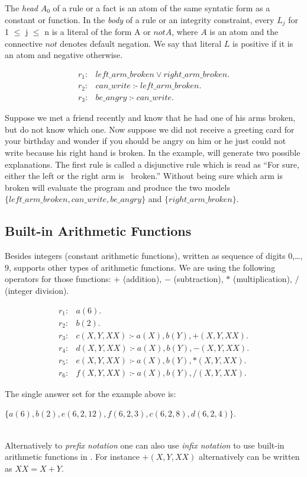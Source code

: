 \documentclass[14pt,a4paper, titlepage]{article}
\DeclareMathOperator{\leftimpl}{:-}
\begin{document}
The \emph{head} $A_0$ of a rule or a fact is an atom of the 
same syntatic form as a constant or function. In the 
\emph{body} of a rule or an integrity constraint, every 
$L_j$ for 1 $\leq$ j $\leq$ n is a literal of the form A or 
$\mathit{not}A$, where $A$ is an atom and the connective 
$\mathit{not}$ denotes default negation. We say that 
literal $L$ is positive if it is an atom and negative 
otherwise. 
\begin{exmp}
\begin{align*}
r_1\colon& \mathit{left\_arm\_broken} \vee 
\mathit{right\_arm\_broken}.\\
r_2\colon& \mathit{can\_write} \leftimpl 
\mathit{left\_arm\_broken}.\\
r_3\colon& \mathit{be\_angry} \leftimpl 
\mathit{can\_write}.
\end{align*}
\end{exmp}
Suppose we met a friend recently and know that he had one 
of his arms broken, but do not know which one. Now suppose 
we did not receive a greeting card for your birthday and 
wonder if you should be angry on him or he just could not 
write because his right hand is broken. In the example, 
\dlvhex{} will generate two possible explanations. The 
first rule is called a disjunctive rule which is read as 
\enquote{For sure, either the left or the right arm is \
broken.} Without being sure which arm is broken \dlvhex{} 
will evaluate the program and produce the two models 
$\mathit{\{left\_arm\_broken, can\_write, be\_angry\}}$ and 
$\mathit{\{right\_arm\_broken\}}$.  

\subsection{Built-in Arithmetic Functions}
Besides integers (constant arithmetic functions), written 
as sequence of digits $0$,\dots,$9$, \dlvhex{} supports 
other types of arithmetic functions. We are using the 
following operators for those functions: $+$ (addition), 
$-$ (subtraction), $*$ (multiplication), $/$ (integer 
division). 
\begin{exmp}
\begin{align*}
r_1\colon& \mathit{a}(6). \\
r_2\colon& \mathit{b}(2). \\
r_3\colon& c(X,Y,XX) \leftimpl a(X), b(Y),+(X, Y, XX). \\
r_4\colon& d(X,Y,XX) \leftimpl a(X), b(Y),-(X, Y, XX). \\
r_5\colon& e(X,Y,XX) \leftimpl a(X), b(Y),*(X, Y, XX). \\
r_6\colon& f(X,Y,XX) \leftimpl a(X), b(Y),/(X, Y, XX).
\end{align*}
\end{exmp}
The single answer set for the example above is:\\ 
\centerline{$\mathit{\{a(6),b(2),e(6,2,12),f(6,2,3),c(6,2,8),d(6,2,4)\}}$.}
\\Alternatively to \emph{prefix notation} one can also use 
\emph{infix notation} to use built-in arithmetic functions 
in \dlvhex{}. For instance $\mathit{+(X, Y, XX)}$ 
alternatively can be written as $\mathit{XX=X+Y}$. 
\end{document}
